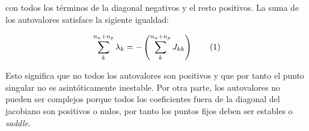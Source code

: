 \noindent con todos los términos de la diagonal negativos y el resto positivos. La suma de los autovalores satisface la sigiente igualdad:

\begin{equation}
  \sum_{k}^{n_{a}+n_{p}} \lambda_{k}= -\left(\sum_{k}^{n_{a}+n_{p}} J_{kk}\right)
  \stepcounter{equation}\tag{\theequation}\label{eq:sum_lambdas}
\end{equation}

Esto significa que no todos los autovalores son positivos y que por tanto el punto singular no es asintóticamente inestable. Por otra parte, los autovalores no pueden ser complejos porque todos los coeficientes fuera de la diagonal del jacobiano son positivos o nulos, por tanto los puntos fijos deben ser estables o \textit{saddle}.